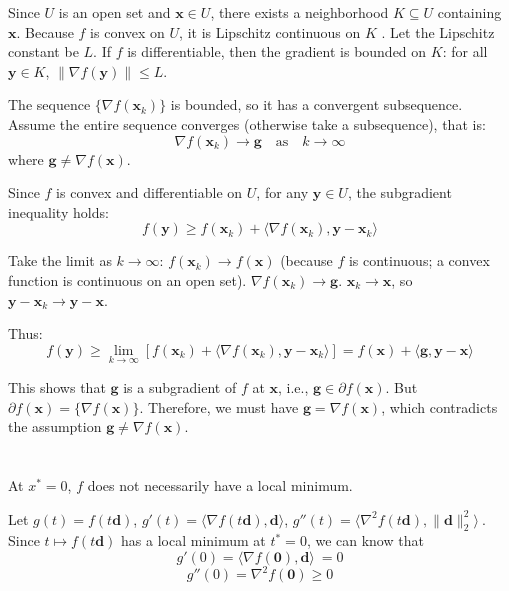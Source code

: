 \documentclass{article}
\begin{document}
Since $ U $ is an open set and $ \mathbf{x} \in U $, there exists a neighborhood $ K \subseteq U $ containing $ \mathbf{x} $. Because $ f $ is convex on $ U $, it is Lipschitz continuous on $ K $ . Let the Lipschitz constant be $ L $. If $ f $ is differentiable, then the gradient is bounded on $ K $: for all $ \mathbf{y} \in K $, $ \|\nabla f(\mathbf{y})\| \leq L $.

The sequence $ \{\nabla f(\mathbf{x}_k)\} $ is bounded, so it has a convergent subsequence. Assume the entire sequence converges (otherwise take a subsequence), that is:
$$
\nabla f(\mathbf{x}_k) \to \mathbf{g} \quad \text{as} \quad k \to \infty
$$
where $ \mathbf{g} \neq \nabla f(\mathbf{x}) $.

Since $ f $ is convex and differentiable on $ U $, for any $ \mathbf{y} \in U $, the subgradient inequality holds:
$$
f(\mathbf{y}) \geq f(\mathbf{x}_k) + \langle \nabla f(\mathbf{x}_k), \mathbf{y} - \mathbf{x}_k \rangle
$$

Take the limit as $ k \to \infty $:
$ f(\mathbf{x}_k) \to f(\mathbf{x}) $ (because $ f $ is continuous; a convex function is continuous on an open set).
$ \nabla f(\mathbf{x}_k) \to \mathbf{g} $.
$ \mathbf{x}_k \to \mathbf{x} $, so $ \mathbf{y} - \mathbf{x}_k \to \mathbf{y} - \mathbf{x}$.

Thus:
$$
f(\mathbf{y}) \geq \lim_{k \to \infty} \left[ f(\mathbf{x}_k) + \langle \nabla f(\mathbf{x}_k), \mathbf{y} - \mathbf{x}_k \rangle \right] = f(\mathbf{x}) + \langle \mathbf{g}, \mathbf{y} - \mathbf{x} \rangle
$$

This shows that $ \mathbf{g} $ is a subgradient of $ f $ at $ \mathbf{x} $, i.e., $ \mathbf{g} \in \partial f(\mathbf{x}) $. But  $ \partial f(\mathbf{x}) = \{\nabla f(\mathbf{x})\} $. Therefore, we must have $ \mathbf{g} = \nabla f(\mathbf{x}) $, which contradicts the assumption $ \mathbf{g} \neq \nabla f(\mathbf{x}) $.

\section{}

At $ x^*=0 $, $f$ does not necessarily have a local minimum.

Let $ g(t) = f(t\mathbf{d}) $, $ g'(t) = \langle\nabla f(t\mathbf{d}), \mathbf{d} \rangle$, $g''(t)= \langle\nabla^2  f(t\mathbf{d}), \|\mathbf{d} \|_2^2 \rangle \ $. Since $ t \mapsto f(t\mathbf{d}) $ has a local minimum at $ t^* = 0 $, we can know that
$$
g'(0)= \langle\nabla f(\mathbf{0}), \mathbf{d} \rangle\ =0
$$
$$
g''(0)= \nabla^2  f(\mathbf{0}) \geq 0
$$
\end{document}
